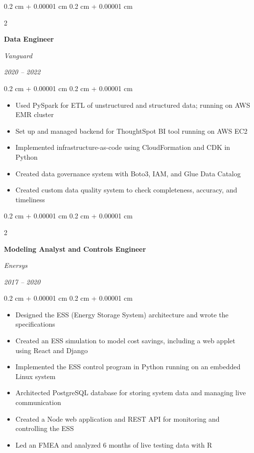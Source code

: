 \documentclass[10pt, letterpaper]{article}
\newenvironment{highlights}{
    \begin{itemize}[
        topsep=0.10 cm,
        parsep=0.10 cm,
        partopsep=0pt,
        itemsep=0pt,
        leftmargin=0.4 cm + 10pt
    ]
}{
    \end{itemize}
} %
\newenvironment{onecolentry}{
    \begin{adjustwidth}{
        0.2 cm + 0.00001 cm
    }{
        0.2 cm + 0.00001 cm
    }
}{
    \end{adjustwidth}
} %
\newenvironment{twocolentry}[2][]{
    \onecolentry
    \def\secondColumn{#2}
    \setcolumnwidth{\fill, 4.5 cm}
    \begin{paracol}{2}
}{
    \switchcolumn \raggedleft \secondColumn
    \end{paracol}
    \endonecolentry
} %
\begin{document}
        \vspace{0.2 cm}

        \begin{twocolentry}{
            
            
        \textit{2020 – 2022}}
            \textbf{Data Engineer}
            
            \textit{Vanguard}
        \end{twocolentry}

        \vspace{0.10 cm}
        \begin{onecolentry}
            \begin{highlights}
                \item Used PySpark for ETL of unstructured and structured data; running on AWS EMR cluster
                \item Set up and managed backend for ThoughtSpot BI tool running on AWS EC2
                \item Implemented infrastructure-as-code using CloudFormation and CDK in Python
                \item Created data governance system with Boto3, IAM, and Glue Data Catalog
                \item Created custom data quality system to check completeness, accuracy, and timeliness
            \end{highlights}
        \end{onecolentry}


        \vspace{0.2 cm}

        \begin{twocolentry}{
            
            
        \textit{2017 – 2020}}
            \textbf{Modeling Analyst and Controls Engineer}
            
            \textit{Enersys}
        \end{twocolentry}

        \vspace{0.10 cm}
        \begin{onecolentry}
            \begin{highlights}
                \item Designed the ESS (Energy Storage System) architecture and wrote the specifications
                \item Created an ESS simulation to model cost savings, including a web applet using React and Django
                \item Implemented the ESS control program in Python running on an embedded Linux system
                \item Architected PostgreSQL database for storing system data and managing live communication
                \item Created a Node web application and REST API for monitoring and controlling the ESS
                \item Led an FMEA and analyzed 6 months of live testing data with R
            \end{highlights}
        \end{onecolentry}
\end{document}
